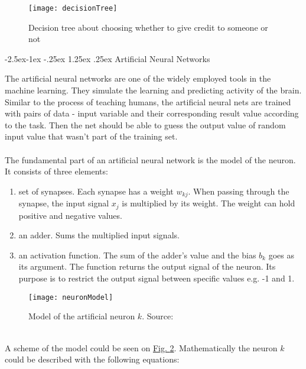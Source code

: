 \documentclass[runningheads,a4paper]{llncs}[2015/06/24]
\makeatletter
\renewcommand\paragraph{\@startsection{paragraph}{4}{\z@}%
            {-2.5ex\@plus -1ex \@minus -.25ex}%
            {1.25ex \@plus .25ex}%
            {\normalfont\normalsize\bfseries}}
\makeatother
\begin{document}
\begin{figure}[h]
\centering
\texttt{[image: decisionTree]}
\caption{Decision tree about choosing whether to give credit to someone or not}
\label{fig:decisionTree}
\end{figure}
		 
\paragraph{Artificial Neural Networks}
	
The artificial neural networks are one of the widely employed tools in the machine learning. They simulate the learning and predicting activity of the brain. Similar to the process of teaching humans, the artificial neural nets are trained with pairs of data - input variable and their corresponding result value according to the task. Then the net should be able to guess the output value of random input value that wasn't part of the training set. \\\\The  fundamental part of an artificial neural network is the model of the neuron. It consists of three elements\cite{haykin2009neural}:
\vspace{-\topsep}
\begin{enumerate}
\item set of synapses. Each synapse has a weight $w_{kj}$.  When passing through the synapse, the input signal $x_j$ is multiplied by its weight. The weight can hold positive and negative values.
\item an adder. Sums the multiplied input signals. 
\item an activation function. The sum of the adder's value and the bias $b_k$ goes as its argument. The function returns the output signal of the neuron. Its purpose is to restrict the output signal between specific values e.g. -1 and 1.
\end{enumerate}
\vspace{-\topsep}

\begin{figure}[h]
\centering
\texttt{[image: neuronModel]}
\caption{Model of the artificial neuron $k$. Source: \cite{haykin2009neural}}
\label{fig:neuronModel}
\end{figure}

\hspace{1cm}\\ A scheme of the model could be seen on \hyperref[fig:neuronModel]{Fig. \ref{fig:neuronModel}}. Mathematically the neuron $k$ could be described with the following equations:
\end{document}
